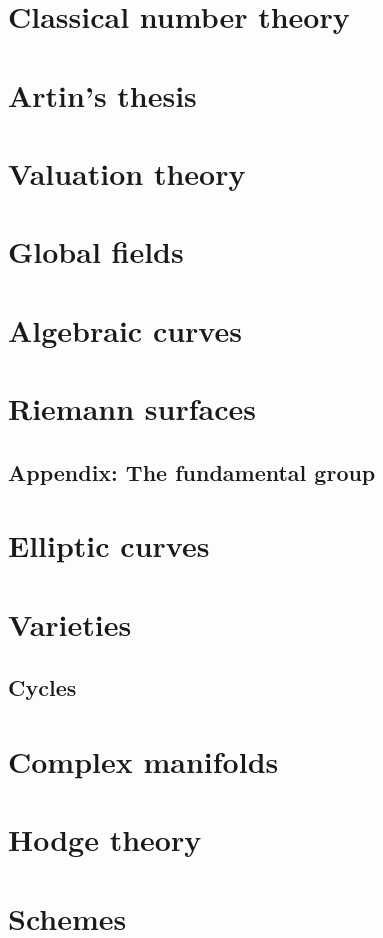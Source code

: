 \documentclass[10pt]{article}
\theoremstyle{definition}
\begin{document}
\section{Classical number theory}
\label{ch:2}

\section{Artin's thesis}
\label{ch:3}

\section{Valuation theory}
\label{ch:4}

\section{Global fields}
\label{ch:5}

\section{Algebraic curves}
\label{ch:6}

\section{Riemann surfaces}
\label{ch:7}

\subsection{Appendix: The fundamental group}
\label{ch:7.8}

\section{Elliptic curves}
\label{ch:8}

\section{Varieties}
\label{ch:9}

\subsection{Cycles}
\label{ch:9.11}


\section{Complex manifolds}
\label{ch:10}

\section{Hodge theory}
\label{ch:11}

\section{Schemes}
\label{ch:12}







\end{document}
